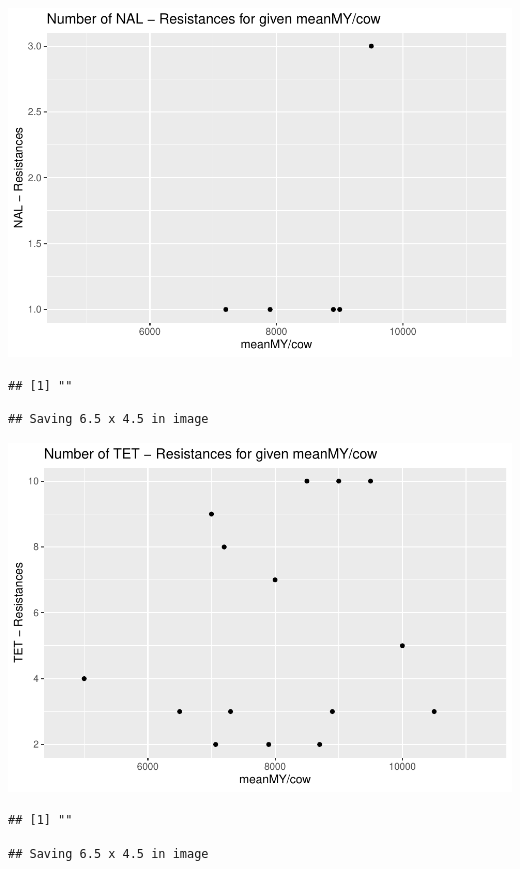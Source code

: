 \documentclass[
]{article}
\begin{document}
\includegraphics{NResistenzen_files/figure-latex/numerical_variables-7.pdf}

\begin{verbatim}
## [1] ""
\end{verbatim}

\begin{verbatim}
## Saving 6.5 x 4.5 in image
\end{verbatim}

\includegraphics{NResistenzen_files/figure-latex/numerical_variables-8.pdf}

\begin{verbatim}
## [1] ""
\end{verbatim}

\begin{verbatim}
## Saving 6.5 x 4.5 in image
\end{verbatim}
\end{document}
